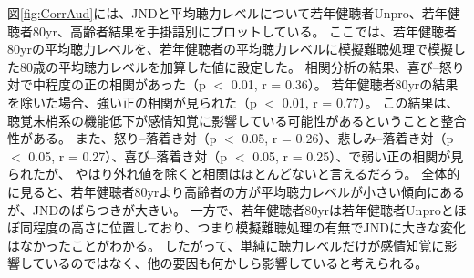 図\ref{fig:CorrAud}には、JNDと平均聴力レベルについて若年健聴者Unpro、若年健聴者80yr、高齢者結果を手掛語別にプロットしている。
ここでは、若年健聴者80yrの平均聴力レベルを、若年健聴者の平均聴力レベルに模擬難聴処理で模擬した80歳の平均聴力レベル\cite{tsuiki2002nihon}を加算した値に設定した。
相関分析の結果、喜び--怒り対で中程度の正の相関があった（p $<$ 0.01, r = 0.36）。
若年健聴者80yrの結果を除いた場合、強い正の相関が見られた（p $<$ 0.01, r = 0.77）。
この結果は、聴覚末梢系の機能低下が感情知覚に影響している可能性があるということと整合性がある。
また、怒り--落着き対（p $<$ 0.05, r = 0.26）、悲しみ--落着き対（p $<$ 0.05, r = 0.27）、喜び--落着き対（p $<$ 0.05, r = 0.25）、で弱い正の相関が見られたが、
やはり外れ値を除くと相関はほとんどないと言えるだろう。
全体的に見ると、若年健聴者80yrより高齢者の方が平均聴力レベルが小さい傾向にあるが、JNDのばらつきが大きい。
一方で、若年健聴者80yrは若年健聴者Unproとほぼ同程度の高さに位置しており、つまり模擬難聴処理の有無でJNDに大きな変化はなかったことがわかる。
したがって、単純に聴力レベルだけが感情知覚に影響しているのではなく、他の要因も何かしら影響していると考えられる。




